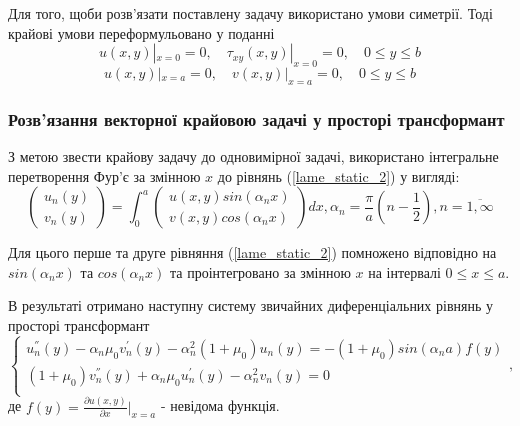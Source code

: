 Для того, щоби розв'язати поставлену задачу використано умови симетрії. Тоді крайові умови переформульовано у поданні
\begin{equation}\label{bound_4_static_2}
    u(x,y) |_{x=0} = 0, \quad \tau_{xy}(x,y) |_{x=0} =0, \quad 0 \le y \le b
\end{equation}
\begin{equation}\label{bound_5_static_2}
    u(x,y) |_{x=a} = 0, \quad v(x,y) |_{x=a} = 0, \quad 0 \le y \le b
\end{equation}

\subsubsection{Розв'язання векторної крайовою задачі у просторі трансформант}
З метою звести крайову задачу до одновимірної задачі, використано інтегральне перетворення Фур'є за змінною $x$ до рівнянь (\ref{lame_static_2}) у вигляді:
\begin{equation}\label{int_trans_static_2}
    \begin{pmatrix}
        u_n(y) \\
        v_n(y)
    \end{pmatrix} = \int_{0}^{a} 
    \begin{pmatrix}
        u(x,y) sin(\alpha_n x) \\
        v(x,y) cos(\alpha_n x)
    \end{pmatrix} dx, \alpha_n = \frac{\pi}{a} (n - \frac{1}{2}), n=\overline{1, \infty}
\end{equation}

Для цього перше та друге рівняння (\ref{lame_static_2}) помножено відповідно на $sin(\alpha_n x)$ та $cos(\alpha_n x)$ та проінтегровано за змінною $x$ на інтервалі $0 \le x \le a$.

В результаті отримано наступну систему звичайних диференціальних рівнянь у просторі трансформант
\begin{equation}\label{transf_static_2}
    \begin{cases}
        u_n^{''}(y) - \alpha_n \mu_0 v_n^{'}(y) - \alpha_n^2 (1 + \mu_0) u_n(y) = -(1 + \mu_0)sin(\alpha_n a) f(y) \\
        (1 + \mu_0) v_n^{''}(y) + \alpha_n \mu_0 u_n^{'}(y)  - \alpha_n^2 v_n(y) = 0 \\
    \end{cases},
\end{equation}
де $f(y) = \frac{\partial u(x,y)}{\partial x}|_{x=a}$ - невідома функція.

